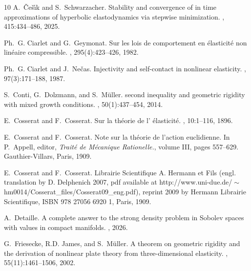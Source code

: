 \documentclass[11pt]{article}
\begin{document}
\begin{footnotesize}
\begin{thebibliography}{10}
A.~{\v{C}}e{\v{s}}{\'\i}k and S.~Schwarzacher.
\newblock Stability and convergence of in time approximations of hyperbolic
  elastodynamics via stepwise minimization.
, 415:434--486, 2025.

Ph.~G. Ciarlet and G.~Geymonat.
\newblock Sur les lois de comportement en {\'e}lasticit{\'e} non lin{\'e}aire
  compressible.
, 295(4):423--426, 1982.

Ph.~G. Ciarlet and J.~Ne\v{c}as.
\newblock Injectivity and self-contact in nonlinear elasticity.
, 97(3):171--188,
  1987.

S.~Conti, G.~Dolzmann, and S.~M{\"u}ller.
 second inequality and geometric rigidity with mixed growth
  conditions.
,
  50(1):437--454, 2014.

E.~Cosserat and F.~Cosserat.
\newblock Sur la th\'eorie de l' \'elasticit\'e.
, 10:1--116, 1896.

E.~Cosserat and F.~Cosserat.
\newblock Note sur la th\'eorie de l'action euclidienne.
\newblock In P.~Appell, editor, {\em Trait\'e de M\'ecanique Rationelle.},
  volume III, pages 557--629. Gauthier-Villars, Paris, 1909.

E.~Cosserat and F.~Cosserat.
\newblock Librairie Scientifique A. Hermann et Fils (engl. translation by D.
  Delphenich 2007, pdf available at
  {http://www.uni-due.de/$\sim$hm0014/Cosserat\_files/Cosserat09\_eng.pdf}),
  reprint 2009 by Hermann Librairie Scientifique, ISBN 978 27056 6920 1, Paris,
  1909.

A.~Detaille.
\newblock A complete answer to the strong density problem in {Sobolev} spaces
  with values in compact manifolds.
, 2026.

G.~Friesecke, R.D. James, and S.~M\"uller.
\newblock A theorem on geometric rigidity and the derivation of nonlinear plate
  theory from three-dimensional elasticity.
, 55(11):1461--1506, 2002.


\end{thebibliography}
\end{footnotesize}
\end{document}

